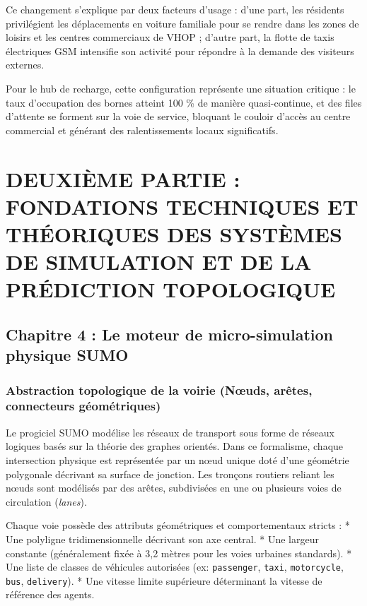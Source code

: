 \documentclass[10pt, a4paper]{article}
\begin{document}
Ce changement s'explique par deux facteurs d'usage : d'une part, les
résidents privilégient les déplacements en voiture familiale pour se
rendre dans les zones de loisirs et les centres commerciaux de VHOP ;
d'autre part, la flotte de taxis électriques GSM intensifie son activité
pour répondre à la demande des visiteurs externes.

Pour le hub de recharge, cette configuration représente une situation
critique : le taux d'occupation des bornes atteint 100 \% de manière
quasi-continue, et des files d'attente se forment sur la voie de
service, bloquant le couloir d'accès au centre commercial et générant
des ralentissements locaux significatifs.

\newpage

\section{DEUXIÈME PARTIE : FONDATIONS TECHNIQUES ET THÉORIQUES DES
SYSTÈMES DE SIMULATION ET DE LA PRÉDICTION
TOPOLOGIQUE}\label{deuxiuxe8me-partie-fondations-techniques-et-thuxe9oriques-des-systuxe8mes-de-simulation-et-de-la-pruxe9diction-topologique}

\subsection{Chapitre 4 : Le moteur de micro-simulation physique
SUMO}\label{chapitre-4-le-moteur-de-micro-simulation-physique-sumo}

\subsubsection{Abstraction topologique de la voirie (Nœuds, arêtes,
connecteurs
géométriques)}\label{abstraction-topologique-de-la-voirie-nux153uds-aruxeates-connecteurs-guxe9omuxe9triques}

Le progiciel SUMO modélise les réseaux de transport sous forme de
réseaux logiques basés sur la théorie des graphes orientés. Dans ce
formalisme, chaque intersection physique est représentée par un nœud
unique doté d'une géométrie polygonale décrivant sa surface de jonction.
Les tronçons routiers reliant les nœuds sont modélisés par des arêtes,
subdivisées en une ou plusieurs voies de circulation (\emph{lanes}).

Chaque voie possède des attributs géométriques et comportementaux
stricts : * Une polyligne tridimensionnelle décrivant son axe central. *
Une largeur constante (généralement fixée à 3,2 mètres pour les voies
urbaines standards). * Une liste de classes de véhicules autorisées (ex:
\texttt{passenger}, \texttt{taxi}, \texttt{motorcycle}, \texttt{bus},
\texttt{delivery}). * Une vitesse limite supérieure déterminant la
vitesse de référence des agents.
\end{document}
